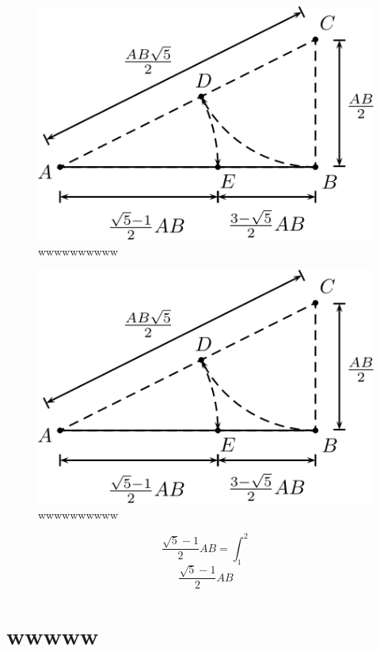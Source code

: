 \documentclass[
  16pt,
]{krantz}
\theoremstyle{definition}
\theoremstyle{definition}
\theoremstyle{definition}
\theoremstyle{definition}
\theoremstyle{remark}
\begin{document}
\begin{figure}

{\centering \includegraphics{aureo} 

}

\caption{wwwwwwwwww}\label{fig:ww1}
\end{figure}

\citet{xie2015}

\begin{figure}

{\centering \includegraphics{aureo} 

}

\caption{wwwwwwwwww}\label{fig:ww2}
\end{figure}

\[\frac{\sqrt{5}-1}{2}AB=\int_1^2\]
\[\frac{\sqrt{5}-1}{2}AB\]

\hypertarget{wwwww}{%
\section{wwwww}\label{wwwww}}
\end{document}
